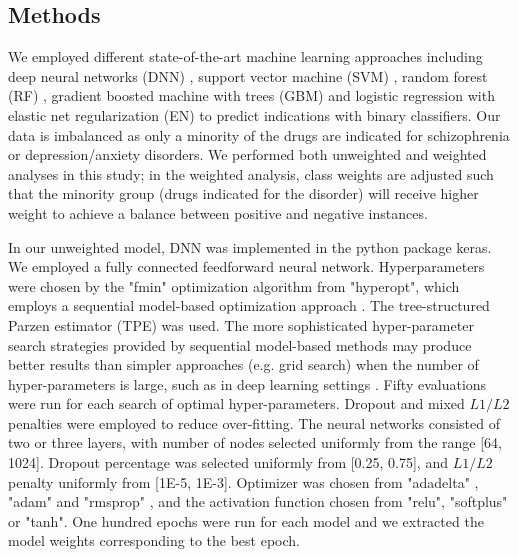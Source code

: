   \subsection{Methods}
    We employed different state-of-the-art machine learning approaches including deep neural networks (DNN) \cite{goodfellow2016deep}, support vector machine (SVM) \cite{cortes1995support}, random forest (RF) \cite{breiman2001random}, gradient boosted machine with trees (GBM) \cite{friedman2001greedy} and logistic regression with elastic net regularization (EN) \cite{zou2005regularization} to predict indications with binary classifiers. Our data is imbalanced as only a minority of the drugs are indicated for schizophrenia or depression/anxiety disorders. We performed both unweighted and weighted analyses in this study; in the weighted analysis, class weights are adjusted such that the minority group (drugs indicated for the disorder) will receive higher weight to achieve a balance between positive and negative instances. 

    In our unweighted model, DNN was implemented in the python package keras. We employed a fully connected feedforward neural network. Hyperparameters were chosen by the "fmin" optimization algorithm from "hyperopt", which employs a sequential model-based optimization approach \cite{bergstra2013hyperopt}. The tree-structured Parzen estimator (TPE) was used. The more sophisticated hyper-parameter search strategies provided by sequential model-based methods may produce better results than simpler approaches (e.g. grid search) when the number of hyper-parameters is large, such as in deep learning settings \cite{bergstra2013hyperopt}. Fifty evaluations were run for each search of optimal hyper-parameters. Dropout and mixed $L1/L2$ penalties were employed to reduce over-fitting. The neural networks consisted of two or three layers, with number of nodes selected uniformly from the range [64, 1024]. Dropout percentage was selected uniformly from [0.25, 0.75], and $L1/L2$ penalty uniformly from [1E-5, 1E-3]. Optimizer was chosen from "adadelta" \cite{zeiler2012adadelta}, "adam" \cite{kingma2014adam} and "rmsprop" \cite{hinton2012neural}, and the activation function chosen from "relu", "softplus" or "tanh". One hundred epochs were run for each model and we extracted the model weights corresponding to the best epoch. 
    
